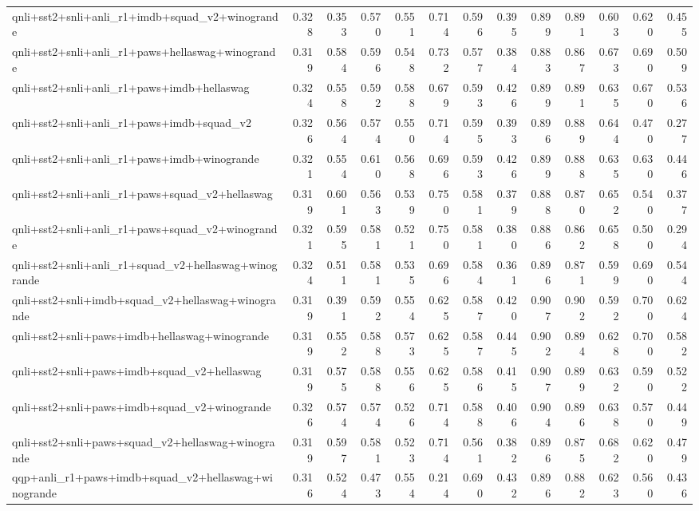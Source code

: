\begin{table}[t]
\begin{tabular}{lrrrrrrrrrrrr}
    qnli+sst2+snli+anli\_r1+imdb+squad\_v2+winogrande & 0.328 & 0.353 & 0.570 & 0.551 & 0.714 & 0.596 & 0.395 & 0.899 & 0.891 & 0.603 & 0.620 & 0.455 \\
    qnli+sst2+snli+anli\_r1+paws+hellaswag+winogrande & 0.319 & 0.584 & 0.596 & 0.548 & 0.732 & 0.577 & 0.384 & 0.883 & 0.867 & 0.673 & 0.690 & 0.509 \\
    qnli+sst2+snli+anli\_r1+paws+imdb+hellaswag & 0.324 & 0.558 & 0.592 & 0.588 & 0.679 & 0.593 & 0.426 & 0.899 & 0.891 & 0.635 & 0.670 & 0.536 \\
    qnli+sst2+snli+anli\_r1+paws+imdb+squad\_v2 & 0.326 & 0.564 & 0.574 & 0.550 & 0.714 & 0.595 & 0.393 & 0.896 & 0.889 & 0.644 & 0.470 & 0.277 \\
    qnli+sst2+snli+anli\_r1+paws+imdb+winogrande & 0.321 & 0.554 & 0.610 & 0.568 & 0.696 & 0.593 & 0.426 & 0.899 & 0.888 & 0.635 & 0.630 & 0.446 \\
    qnli+sst2+snli+anli\_r1+paws+squad\_v2+hellaswag & 0.319 & 0.601 & 0.563 & 0.539 & 0.750 & 0.581 & 0.379 & 0.888 & 0.870 & 0.652 & 0.540 & 0.377 \\
    qnli+sst2+snli+anli\_r1+paws+squad\_v2+winogrande & 0.321 & 0.595 & 0.581 & 0.521 & 0.750 & 0.581 & 0.380 & 0.886 & 0.862 & 0.658 & 0.500 & 0.294 \\
    qnli+sst2+snli+anli\_r1+squad\_v2+hellaswag+winogrande & 0.324 & 0.511 & 0.581 & 0.535 & 0.696 & 0.584 & 0.361 & 0.896 & 0.871 & 0.599 & 0.690 & 0.544 \\
    qnli+sst2+snli+imdb+squad\_v2+hellaswag+winogrande & 0.319 & 0.391 & 0.592 & 0.554 & 0.625 & 0.587 & 0.420 & 0.907 & 0.902 & 0.592 & 0.700 & 0.624 \\
    qnli+sst2+snli+paws+imdb+hellaswag+winogrande & 0.319 & 0.552 & 0.588 & 0.573 & 0.625 & 0.587 & 0.445 & 0.902 & 0.894 & 0.628 & 0.700 & 0.582 \\
    qnli+sst2+snli+paws+imdb+squad\_v2+hellaswag & 0.319 & 0.575 & 0.588 & 0.556 & 0.625 & 0.586 & 0.415 & 0.907 & 0.899 & 0.632 & 0.590 & 0.522 \\
    qnli+sst2+snli+paws+imdb+squad\_v2+winogrande & 0.326 & 0.574 & 0.574 & 0.526 & 0.714 & 0.588 & 0.406 & 0.904 & 0.896 & 0.638 & 0.570 & 0.449 \\
    qnli+sst2+snli+paws+squad\_v2+hellaswag+winogrande & 0.319 & 0.597 & 0.581 & 0.523 & 0.714 & 0.561 & 0.382 & 0.896 & 0.875 & 0.682 & 0.620 & 0.479 \\
    qqp+anli\_r1+paws+imdb+squad\_v2+hellaswag+winogrande & 0.316 & 0.524 & 0.473 & 0.554 & 0.214 & 0.690 & 0.432 & 0.896 & 0.882 & 0.623 & 0.560 & 0.436 \\

\end{tabular}
\end{table}
